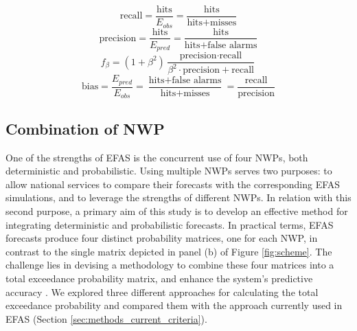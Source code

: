 \documentclass{ametsocV6.1}
\begin{document}
\begin{equation}
    \text{recall} = \frac{\text{hits}}{E_{obs}} = \frac{\text{hits}}{\text{hits} + \text{misses}}
    \label{eq:recall}
\end{equation}
\begin{equation}
    \text{precision} = \frac{\text{hits}}{E_{pred}} = \frac{\text{hits}}{\text{hits} + \text{false alarms}}
    \label{eq:precision}
\end{equation}
\begin{equation}
    f_{\beta} = \left( 1 + \beta^2 \right) \frac{\text{precision} \cdot \text{recall}}{\beta^2 \cdot \text{precision} + \text{recall}}
    \label{eq:fscore}
\end{equation}
\begin{equation}
    \text{bias} = \frac{E_{pred}}{E_{obs}} = \frac{\text{hits} + \text{false alarms}} {\text{hits} + \text{misses}} = \frac{\text{recall}}{\text{precision}}
    \label{eq:bias}
\end{equation}

\subsection{Combination of NWP}
\label{sec:methods_COMB}

One of the strengths of EFAS is the concurrent use of four NWPs, both deterministic and probabilistic. Using multiple NWPs serves two purposes: to allow national services to compare their forecasts with the corresponding EFAS simulations, and to leverage the strengths of different NWPs. In relation with this second purpose, a primary aim of this study is to develop an effective method for integrating deterministic and probabilistic forecasts. In practical terms, EFAS forecasts produce four distinct probability matrices, one for each NWP, in contrast to the single matrix depicted in panel (b) of Figure \ref{fig:scheme}. The challenge lies in devising a methodology to combine these four matrices into a total exceedance probability matrix, and enhance the system's predictive accuracy \citep{Wetterhall2013}. We explored three different approaches for calculating the total exceedance probability and compared them with the approach currently used in EFAS (Section \ref{sec:methods_current_criteria}).
\end{document}

